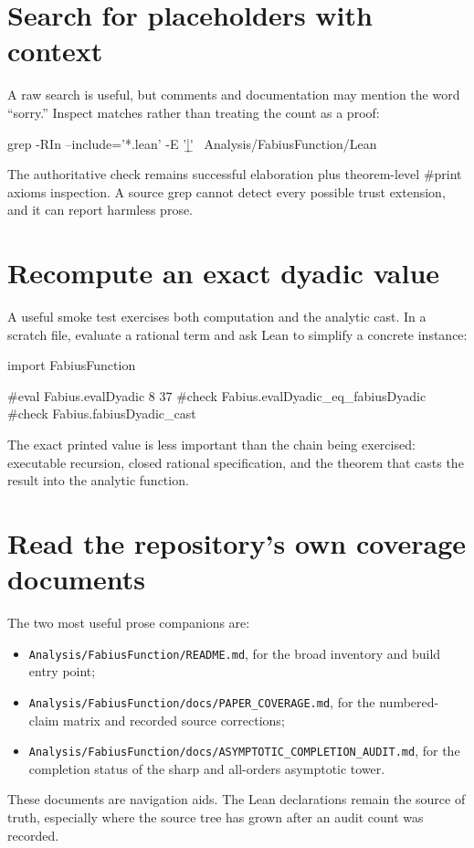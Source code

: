 \documentclass[11pt,a4paper,openany]{book}
\def\code#1{#1}
\newcommand{\code}[1]{\texttt{\detokenize{#1}}}
\newcommand{\pathbreak}[1]{\nolinkurl{#1}}
\begin{document}
\section{Search for placeholders with context}
A raw search is useful, but comments and documentation may mention the word
``sorry.''  Inspect matches rather than treating the count as a proof:

\begin{ShellCode}
grep -RIn --include='*.lean' -E '\bsorry\b|\badmit\b' \
  Analysis/FabiusFunction/Lean
\end{ShellCode}
The authoritative check remains successful elaboration plus theorem-level
\code{#print axioms} inspection.  A source grep cannot detect every possible
trust extension, and it can report harmless prose.

\section{Recompute an exact dyadic value}
A useful smoke test exercises both computation and the analytic cast.  In a
scratch file, evaluate a rational term and ask Lean to simplify a concrete
instance:

\begin{LeanCode}
import FabiusFunction

#eval Fabius.evalDyadic 8 37
#check Fabius.evalDyadic_eq_fabiusDyadic
#check Fabius.fabiusDyadic_cast
\end{LeanCode}
The exact printed value is less important than the chain being exercised:
executable recursion, closed rational specification, and the theorem that
casts the result into the analytic function.

\section{Read the repository's own coverage documents}
The two most useful prose companions are:
\begin{itemize}
  \item \pathbreak{Analysis/FabiusFunction/README.md}, for the broad inventory
        and build entry point;
  \item \pathbreak{Analysis/FabiusFunction/docs/PAPER_COVERAGE.md}, for the
        numbered-claim matrix and recorded source corrections;
  \item \pathbreak{Analysis/FabiusFunction/docs/ASYMPTOTIC_COMPLETION_AUDIT.md},
        for the completion status of the sharp and all-orders asymptotic tower.
\end{itemize}
These documents are navigation aids.  The Lean declarations remain the source
of truth, especially where the source tree has grown after an audit count was
recorded.
\end{document}
